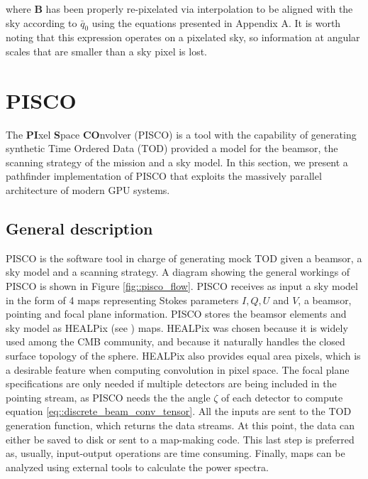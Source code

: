 \documentclass[a4paper,11pt]{article}
\begin{document}
\noindent
where $\mathbf{B}$ has been properly re-pixelated via interpolation to be aligned with the sky according to $\bar{q}_0$ using the equations presented in Appendix A. It is worth noting that this expression operates on a pixelated sky, so information at angular scales that are smaller than a sky pixel is lost.

\section{PISCO}
\label{sec::pisco}

The \textbf{PI}xel \textbf{S}pace \textbf{CO}nvolver (PISCO) is a tool with the capability of generating synthetic Time Ordered Data (TOD) provided a model for the beamsor, the scanning strategy of the mission and a sky model. In this section, we present a pathfinder implementation of PISCO that exploits the massively parallel architecture of modern GPU systems.

\subsection{General description}

PISCO is the software tool in charge of generating mock TOD given a beamsor, a sky model and a scanning strategy. A diagram showing the general workings of PISCO is shown in Figure \ref{fig::pisco_flow}. PISCO receives as input a sky model in the form of 4 maps representing Stokes parameters $I,Q,U$ and $V$, a beamsor, pointing and focal plane information. PISCO stores the beamsor elements and sky model as HEALPix (see \cite{2005ApJ...622..759G}) maps. HEALPix was chosen because it is widely used among the CMB community, and because it naturally handles the closed surface topology of the sphere. HEALPix also provides equal area pixels, which is a desirable feature when computing convolution in pixel space. The focal plane specifications are only needed if multiple detectors are being included in the pointing stream, as PISCO needs the the angle $\zeta$ of each detector to compute equation \ref{eq::discrete_beam_conv_tensor}. All the inputs are sent to the TOD generation function, which returns the data streams. At this point, the data can either be saved to disk or sent to a map-making code. This last step is preferred as, usually, input-output operations are time consuming. Finally, maps can be analyzed using external tools to calculate the power spectra.
\end{document}
